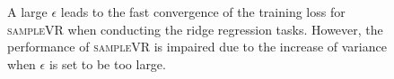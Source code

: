 \documentclass[letterpaper]{article}
\begin{document}
\begin{figure}[t]
\centering
{}
\caption{A large $\epsilon$ leads to the fast convergence of the training loss for \textsc{sampleVR} when conducting the ridge regression tasks. However, the performance of  \textsc{sampleVR} is impaired  due to the increase of variance when $\epsilon$ is set to be too large.}
\label{figure_ridge_regression_rho}
\end{figure}
\end{document}

